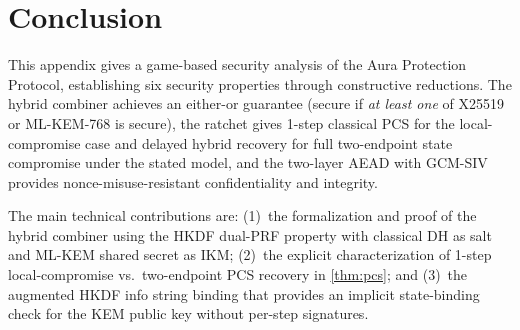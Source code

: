 \documentclass[11pt,a4paper]{article}
\theoremstyle{definition}
\theoremstyle{remark}
\begin{document}
\section{Conclusion}
\label{sec:conclusion}

This appendix gives a game-based security analysis of the Aura Protection
Protocol, establishing six security properties through constructive reductions.
The hybrid combiner achieves an either-or guarantee (secure if \emph{at least
one} of X25519 or ML-KEM-768 is secure), the ratchet gives 1-step classical PCS
for the local-compromise case and delayed hybrid recovery for full
two-endpoint state compromise under the stated model, and the two-layer AEAD
with GCM-SIV provides nonce-misuse-resistant confidentiality and integrity.

The main technical contributions are: (1)~the formalization and proof of the
hybrid combiner using the HKDF dual-PRF property with classical DH as salt
and ML-KEM shared secret as IKM; (2)~the explicit characterization of 1-step
local-compromise vs.\ two-endpoint PCS recovery in \cref{thm:pcs}; and (3)~the
augmented HKDF info string binding that provides an implicit state-binding
check for the KEM public key without per-step signatures.
\end{document}
